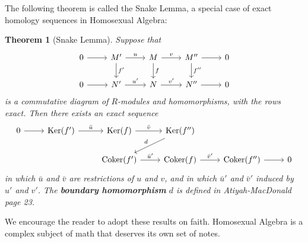 \documentclass[11pt]{article}
\newtheorem{theorem}{Theorem}
\newcommand{\Ker}{\operatorname{Ker}}
\newcommand{\Coker}{\operatorname{Coker}}
\begin{document}
The following theorem is called the Snake Lemma, a special case of exact homology sequences in Homosexual Algebra: 

\begin{adjustwidth}{1cm}{}
  \begin{theorem}[Snake Lemma]
    Suppose that
    \[ \begin{tikzcd}
      0 \arrow[r] & M' \arrow[r, "u"] \arrow[d, "f'"] & M \arrow[r, "v"] \arrow[d, "f"] & M'' \arrow[r] \arrow[d, "f''"] & 0 \\
      0 \arrow[r] & N' \arrow[r, "u'"]                & N \arrow[r, "v'"]               & N'' \arrow[r]                  & 0
    \end{tikzcd} \]
    is a commutative diagram of $R$-modules and homomorphisms, with the rows exact. Then there exists an exact sequence
    \[ \begin{tikzcd}
      0 \arrow[r] & \Ker(f') \arrow[r, "\bar{u}"] & \Ker(f) \arrow[r, "\bar{v}"]     & \Ker(f'') \arrow[ld, "d"']      &                       &   \\
                  &                               & \Coker(f') \arrow[r, "\bar{u}'"] & \Coker(f) \arrow[r, "\bar{v}'"] & \Coker(f'') \arrow[r] & 0
    \end{tikzcd} \]
    in which $\bar{u}$ and $\bar{v}$ are restrictions of $u$ and $v$, and in which $\bar{u}'$ and $\bar{v}'$ induced by $u'$ and $v'$. The \textbf{boundary homomorphism} $d$ is defined in Atiyah-MacDonald page 23.
  \end{theorem}
\end{adjustwidth}

We encourage the reader to adopt these results on faith. Homosexual Algebra is a complex subject of math that deserves its own set of notes.

\end{document}
